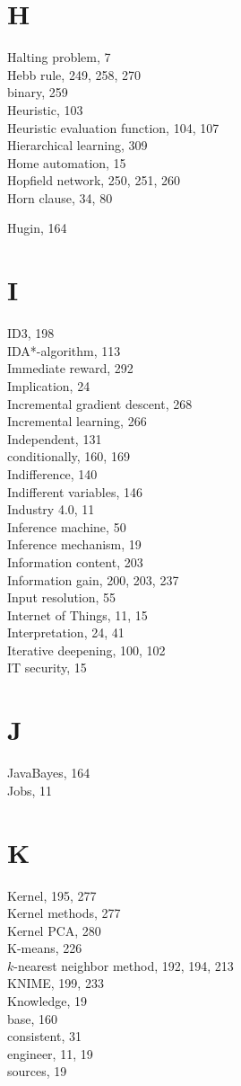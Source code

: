 \documentclass[10pt]{book}
\begin{document}
\section*{H}
Halting problem, 7\\
Hebb rule, 249, 258, 270\\
binary, 259\\
Heuristic, 103\\
Heuristic evaluation function, 104, 107\\
Hierarchical learning, 309\\
Home automation, 15\\
Hopfield network, 250, 251, 260\\
Horn clause, 34, 80

Hugin, 164

\section*{I}
ID3, 198\\
IDA*-algorithm, 113\\
Immediate reward, 292\\
Implication, 24\\
Incremental gradient descent, 268\\
Incremental learning, 266\\
Independent, 131\\
conditionally, 160, 169\\
Indifference, 140\\
Indifferent variables, 146\\
Industry 4.0, 11\\
Inference machine, 50\\
Inference mechanism, 19\\
Information content, 203\\
Information gain, 200, 203, 237\\
Input resolution, 55\\
Internet of Things, 11, 15\\
Interpretation, 24, 41\\
Iterative deepening, 100, 102\\
IT security, 15

\section*{J}
JavaBayes, 164\\
Jobs, 11

\section*{K}
Kernel, 195, 277\\
Kernel methods, 277\\
Kernel PCA, 280\\
K-means, 226\\
$k$-nearest neighbor method, 192, 194, 213\\
KNIME, 199, 233\\
Knowledge, 19\\
base, 160\\
consistent, 31\\
engineer, 11, 19\\
sources, 19
\end{document}
